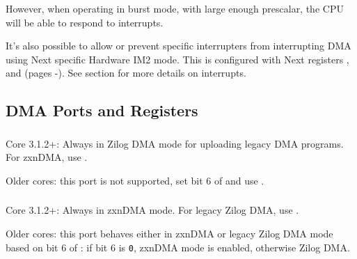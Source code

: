 {However, when operating in burst mode, with large enough prescalar, the CPU will be able to respond to interrupts.

It's also possible to allow or prevent specific interrupters from interrupting DMA using Next specific Hardware IM2 mode. This is configured with Next registers ,  and  (pages -). See section  for more details on interrupts.


\pagebreak
\subsection{DMA Ports and Registers}
\label{zx_next_dma_registers}


\subsubsection{}

Core 3.1.2+: Always in Zilog DMA mode for uploading legacy DMA programs. For zxnDMA, use .

Older cores: this port is not supported, set bit 6 of  and use .


\subsubsection{}

Core 3.1.2+: Always in zxnDMA mode. For legacy Zilog DMA, use .

Older cores: this port behaves either in zxnDMA or legacy Zilog DMA mode based on bit 6 of : if bit 6 is {\tt 0}, zxnDMA mode is enabled, otherwise Zilog DMA.


\subsubsection{}



\subsubsection{}

}

